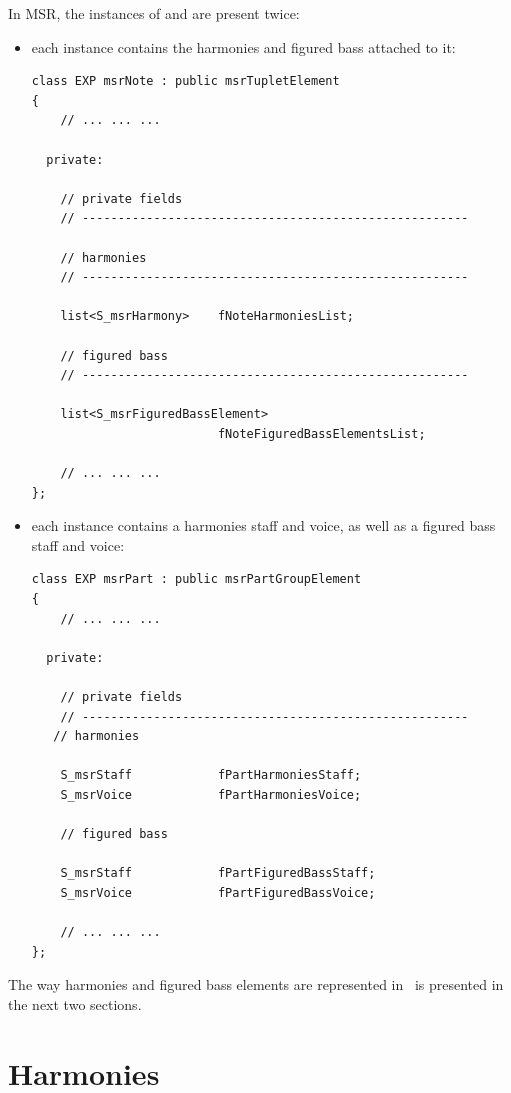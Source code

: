 In MSR, the instances of  and  are present twice:
\begin{itemize}
\item each  instance contains the harmonies and figured bass attached to it:
\begin{lstlisting}[language=CPlusPlus]
class EXP msrNote : public msrTupletElement
{
	// ... ... ...

  private:

    // private fields
    // ------------------------------------------------------

    // harmonies
    // ------------------------------------------------------

    list<S_msrHarmony>    fNoteHarmoniesList;

    // figured bass
    // ------------------------------------------------------

    list<S_msrFiguredBassElement>
                          fNoteFiguredBassElementsList;

	// ... ... ...
};
\end{lstlisting}

\item each  instance contains a harmonies staff and voice, as well as a figured bass staff and voice:
\begin{lstlisting}[language=CPlusPlus]
class EXP msrPart : public msrPartGroupElement
{
	// ... ... ...

  private:

    // private fields
    // ------------------------------------------------------
   // harmonies

    S_msrStaff            fPartHarmoniesStaff;
    S_msrVoice            fPartHarmoniesVoice;

    // figured bass

    S_msrStaff            fPartFiguredBassStaff;
    S_msrVoice            fPartFiguredBassVoice;

	// ... ... ...
};
\end{lstlisting}
\end{itemize}

The way harmonies and figured bass elements are represented in \mf\ is presented in the next two sections.


\section{Harmonies}\label{Harmonies}

